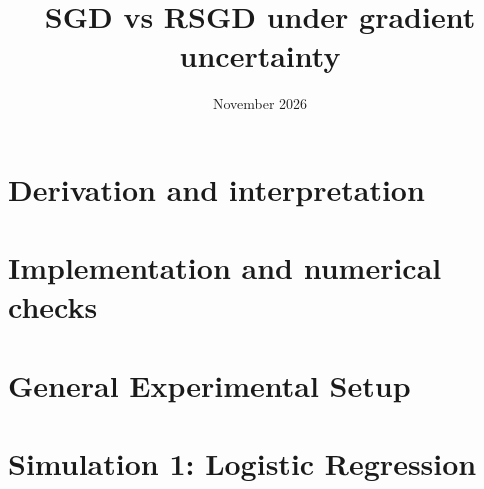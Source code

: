 \documentclass[a4paper, 12pt]{article}
\title{SGD vs RSGD under gradient uncertainty}
\date{November 2026}
\author{}
\begin{document}
\maketitle

\section{Derivation and interpretation}



\section{Implementation and numerical checks}

\section{General Experimental Setup}
\label{sec:general_setup}


\section{Simulation 1: Logistic Regression}

\end{document}

